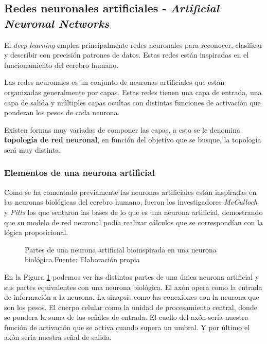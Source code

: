 \subsection{Redes neuronales artificiales - \textit{Artificial Neuronal Networks}}
El \textit{deep learning} emplea principalmente redes neuronales para reconocer, clasificar y describir con precisión patrones de datos. Estas redes están inspiradas en el funcionamiento del cerebro humano.  \cite{ibm-deep-learning}

Las redes neuronales es un conjunto de neuronas artificiales que están organizadas generalmente por capas. Estas redes tienen una capa de entrada, una capa de salida y múltiples capas ocultas con distintas funciones de activación que ponderan los pesos de cada neurona.

Existen formas muy variadas de componer las capas, a esto se le denomina \textbf{topología de red neuronal}, en función del objetivo que se busque, la topología será muy distinta.

\subsubsection{Elementos de una neurona artificial}

Como se ha comentado previamente las neuronas artificiales están inspiradas en las neuronas biológicas del cerebro humano, fueron los investigadores \textit{McCulloch} y \textit{Pitts} \cite{mcculloch1943logical} los que sentaron las bases de lo que es una neurona artificial, demostrando que su modelo de red neuronal podía realizar cálculos que se correspondían con la lógica proposicional.


\begin{figure}[H]
    \centering
    \centerline{}
    \caption{Partes de una neurona artificial bioinspirada en una neurona biológica.\newline{}Fuente: Elaboración propia}
    \label{fig:artificial-neuron}
\end{figure}

En la Figura \ref{fig:artificial-neuron} podemos ver las distintas partes de una única neurona artificial y sus partes equivalentes con una neurona biológica. El axón opera como la entrada de información a la neurona. La sinapsis como las conexiones con la neurona que son los pesos. El cuerpo celular como la unidad de procesamiento central, donde se pondera la suma de las señales de entrada. El cuello del axón sería nuestra función de activación que se activa cuando supera un umbral. Y por último el axón sería nuestra señal de salida.



